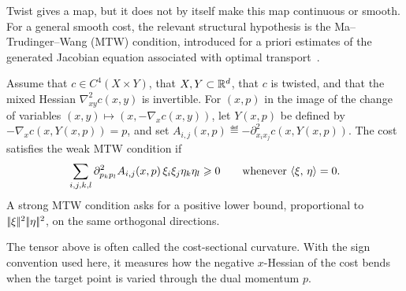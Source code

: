 Twist gives a map, but it does not by itself make this map continuous or smooth. For a general smooth cost, the relevant structural hypothesis is the Ma--Trudinger--Wang (MTW) condition, introduced for a priori estimates of the generated Jacobian equation associated with optimal transport~\cite{ma2005regularity,trudinger2001monge}.

\begin{defn}\label{def-mtw-condition}
	Assume that $c\in C^4(X\times Y)$, that $X,Y\subset\mathbb{R}^d$, that $c$ is twisted, and that the mixed Hessian $\nabla^2_{xy}c(x,y)$ is invertible. For $(x,p)$ in the image of the change of variables $(x,y)\mapsto(x,-\nabla_x c(x,y))$, let $Y(x,p)$ be defined by
	$-\nabla_x c(x,Y(x,p))=p$, and set
	$A_{i,j}(x,p)\eqdef-\partial^2_{x_i x_j}c(x,Y(x,p))$.
	The cost satisfies the weak MTW condition if
	\[
		\sum_{i,j,k,l}\partial^2_{p_k p_l} A_{i,j}(x,p)\,\xi_i\xi_j\eta_k\eta_l\geqslant0
		\qquad\text{whenever }\langle \xi,\,\eta\rangle=0.
	\]
	A strong MTW condition asks for a positive lower bound, proportional to $|\!| \xi |\!|^2|\!| \eta |\!|^2$, on the same orthogonal directions.
\end{defn}

The tensor above is often called the cost-sectional curvature. With the sign convention used here, it measures how the negative $x$-Hessian of the cost bends when the target point is varied through the dual momentum $p$.

